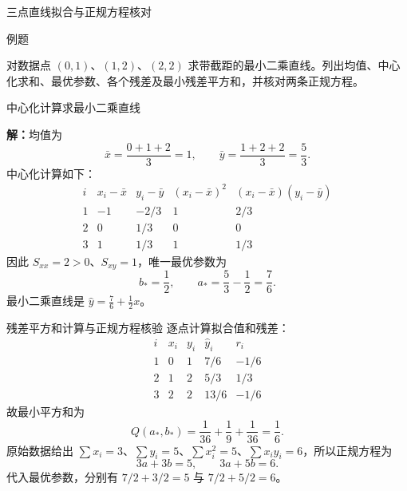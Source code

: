 \documentclass[aspectratio=169,10pt,fontset=fandol]{ctexbeamer}
\begin{document}
\begin{frame}[t,fragile]{三点直线拟合与正规方程核对}
\normalsize
\begin{block}{例题}
{\normalsize
对数据点 $(0,1)$、$(1,2)$、$(2,2)$ 求带截距的最小二乘直线。列出均值、中心化求和、最优参数、各个残差及最小残差平方和，并核对两条正规方程。

}
\end{block}
\end{frame}
\begin{frame}[t,fragile]{中心化计算求最小二乘直线}
\footnotesize
{\footnotesize
\par\noindent\textbf{解：}均值为
\[
\bar{x}=\frac{0+1+2}{3}=1,\qquad
\bar{y}=\frac{1+2+2}{3}=\frac53.
\]
中心化计算如下：
\[
\begin{array}{c|r|r|r|r}
i&x_i-\bar{x}&y_i-\bar{y}&(x_i-\bar{x})^2&(x_i-\bar{x})(y_i-\bar{y})\\ \hline
1&-1&-2/3&1&2/3\\
2&0&1/3&0&0\\
3&1&1/3&1&1/3
\end{array}
\]
因此 $S_{xx}=2>0$、$S_{xy}=1$，唯一最优参数为
\[
b_* =\frac12,\qquad a_* =\frac53-\frac12=\frac76.
\]
最小二乘直线是 $\hat{y}=\frac76+\frac12x$。
}
\end{frame}
\begin{frame}[t,fragile]{残差平方和计算与正规方程核验}
\footnotesize
{\footnotesize
逐点计算拟合值和残差：
\[
\begin{array}{c|r|r|r|r}
i&x_i&y_i&\hat{y}_i&r_i\\ \hline
1&0&1&7/6&-1/6\\
2&1&2&5/3&1/3\\
3&2&2&13/6&-1/6
\end{array}
\]
故最小平方和为
\[
Q(a_*,b_*)=\frac1{36}+\frac19+\frac1{36}=\frac16.
\]
原始数据给出 $\sum x_i=3$、$\sum y_i=5$、$\sum x_i^2=5$、$\sum x_i y_i=6$，所以正规方程为
\[
3a+3b=5,\qquad 3a+5b=6.
\]
代入最优参数，分别有 $7/2+3/2=5$ 与 $7/2+5/2=6$。
}
\end{frame}
\end{document}
